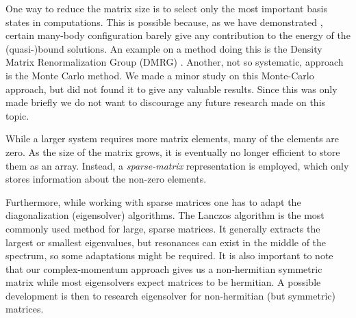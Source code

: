 \documentclass[../main/report.tex]{subfiles}
\begin{document}
One way to reduce the matrix size is to select only the most important basis states in computations.
This is possible because, as we have demonstrated
, certain many-body configuration barely give any contribution to the energy of the (quasi-)bound solutions. 
An example on a method doing this is the Density Matrix Renormalization Group (DMRG) \cite{DMRG}.
Another, not so systematic, approach is the Monte Carlo method.
We made a minor study on this Monte-Carlo approach, but did not found it to give any valuable results.
Since this was only made briefly we do not want to discourage any future research made on this topic.

While a larger system requires more matrix elements, many of the elements are zero. 
As the size of the matrix grows, it is eventually no longer efficient to store them as an array. 
Instead, a \emph{sparse-matrix} representation is employed, which only stores information about the non-zero elements. 

Furthermore, while working with sparse matrices one has to adapt the diagonalization (eigensolver) algorithms. 
The Lanczos algorithm is the most commonly used method for large, sparse matrices.
It generally extracts the largest or smallest eigenvalues, but resonances can exist in the middle of the spectrum, so some adaptations might be required.
It is also important to note that our complex-momentum approach gives us a non-hermitian symmetric matrix while most eigensolvers expect matrices to be hermitian. A possible development is then to research eigensolver for non-hermitian (but symmetric) matrices.

\end{document}

